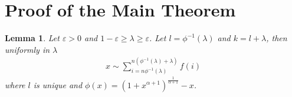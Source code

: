 \documentclass[10pt]{article}
\theoremstyle{plain}
\newtheorem{lemma}{Lemma}
\theoremstyle{definition}
\let\epsilon\varepsilon
\begin{document}
	
	
	
	\section{Proof of the Main Theorem}\label{mainTheorem}
	
	

	\begin{lemma}\label{l,k paramtrization}
		Let $\epsilon>0$ and $1-\epsilon\geq\lambda\geq\epsilon$. Let $l=\phi^{-1}(\lambda)$ and $k=l+\lambda$, then uniformly in $\lambda$
		\begin{align}
			x\sim \sum_{i=n\phi^{-1}(\lambda)}^{n(\phi^{-1}(\lambda)+\lambda)} f(i)
		\end{align}
		where $l$ is unique and $\phi(x)=(1+x^{\alpha+1})^{\frac{1}{\alpha+1}}-x$.
	\end{lemma}
	
\end{document}
